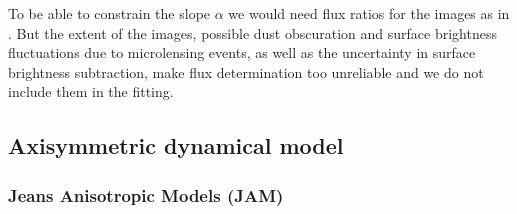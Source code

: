 \documentclass[useAMS,usenatbib]{mnras}
\begin{document}
To be able to constrain the slope $\alpha$ we would need flux ratios for the images as in \citet{GlennEC}. But the extent of the images, possible dust obscuration and surface brightness fluctuations due to microlensing events, as well as the uncertainty in surface brightness subtraction, make flux determination too unreliable and we do not include them in the fitting.

\subsection{Axisymmetric dynamical model} \label{sec:model_JAM}

\subsubsection{Jeans Anisotropic Models (JAM)} \label{sec:model_JAM_JAM}
\end{document}

